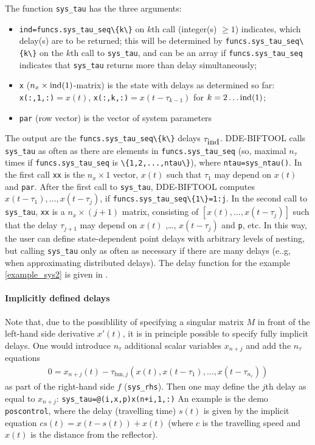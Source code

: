 \documentclass[10pt]{scrartcl}
\newcommand{\DDEBIFCODE}{\textsc{DDE-BIFTOOL}}
\newcommand{\blist}[1]{\mbox{\lstinline!#1!}}
\begin{document}
The function \blist{sys_tau} has the three arguments:
\begin{itemize}
\item \blist{ind=funcs.sys_tau_seq\{k\}} on $k$th call (integer(s)
  $\geq1$) indicates, which delay(s) are to be returned; this will be
  determined by \blist{funcs.sys_tau_seq\{k\}} on the $k$th call to
  \blist{sys_tau}, and can be an array if \blist{funcs.sys_tau_seq}
  indicates that \blist{sys_tau} returns more than delay
  simultaneously;
\item \blist{x} ($ n_x\times\blist{ind(1)}$-matrix) is the state with delays as determined so far:
  \blist{x(:,1,:)}$=x(t)$, \blist{x(:,k,:)}$=x(t-\tau_{k-1})$ for
  $k=2\ldots\blist{ind(1)}$;
\item \blist{par} (row vector) is the vector of system parameters
\end{itemize}
The output are the \blist{funcs.sys_tau_seq\{k\}} delays
$\tau_{\blist{ind}}$. \DDEBIFCODE{} calls \blist{sys_tau} as often as
there are elements in \blist{funcs.sys_tau_seq} (so, maximal $n_\tau$
times if \blist{funcs.sys_tau_seq} is \blist{\{1,2,...,ntau\}}), where
\blist{ntau=sys_ntau()}. In the first call \blist{xx} is the
$n_x\times1$ vector, $x(t)$ such that $\tau_1$ may depend on $x(t)$
and \blist{par}. After the first call to \blist{sys_tau},
\DDEBIFCODE{} computes $x(t-\tau_1),\ldots,x(t-\tau_j)$, if
\blist{funcs.sys_tau_seq\{1\}=1:j}. In the second call to
\blist{sys_tau}, \blist{xx} is a $n_x\times(j+1)$ matrix, consisting
of $[x(t),\ldots,x(t-\tau_j)]$ such that the delay $\tau_{j+1}$ may
depend on $x(t)$ ,\ldots, $x(t-\tau_j)$ and \blist{p}, etc. In this
way, the user can define state-dependent point delays with arbitrary
levels of nesting, but calling \blist{sys_tau} only as often as
necessary if there are many delays (e..g, when approximating
distributed delays). The delay function for the example
\eqref{example_sys2} is given in .

\paragraph{Implicitly defined delays}
Note that, due to the possiblility of specifying a singular matrix $M$
in front of the left-hand side derivative $x'(t)$, it is in principle
possible to specify fully implicit delays. One would introduce $n_\tau$
additional scalar variables $x_{n+j}$ and add the $n_\tau$ equations 
\begin{align*}
  0=x_{n+j}(t)-\tau_{\mathrm{fun},j}(x(t),x(t-\tau_1),\ldots,x(t-\tau_{n_\tau}))
\end{align*}
as part of the right-hand side $f$ (\blist{sys_rhs}). Then one may
define the $j$th delay as equal to $x_{n+j}$:
\blist{sys_tau=@(i,x,p)x(n+i,1,:)} An example is the demo
\blist{poscontrol}, where the delay (travelling time) $s(t)$ is given
by the implicit equation $cs(t)=x(t-s(t))+x(t)$ (where $c$ is the
travelling speed and $x(t)$ is the distance from the reflector).
\end{document}
